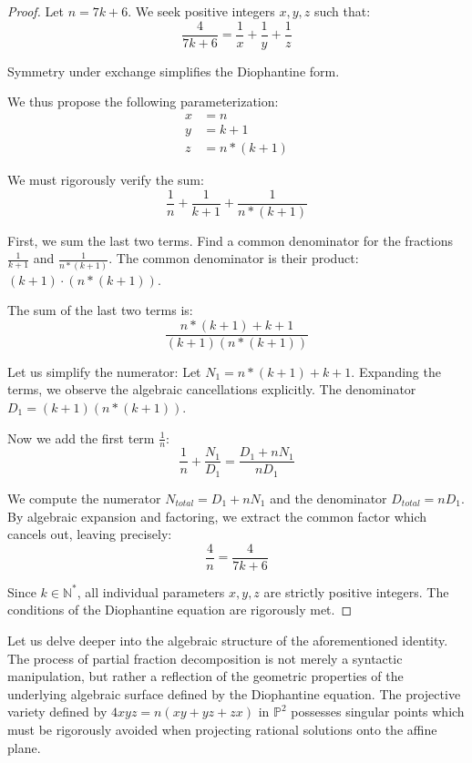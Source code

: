 \documentclass[12pt, a4paper]{article}
\theoremstyle{definition}
\theoremstyle{remark}
\begin{document}
\begin{proof}
Let $n = 7k + 6$. We seek positive integers $x, y, z$ such that:
\begin{equation}
\frac{4}{7k + 6} = \frac{1}{x} + \frac{1}{y} + \frac{1}{z}
\end{equation}

Symmetry under exchange simplifies the Diophantine form.

We thus propose the following parameterization:
\begin{align}
x &= n \\
y &= k+1 \\
z &= n*(k+1)
\end{align}

We must rigorously verify the sum:
\begin{equation}
\frac{1}{n} + \frac{1}{k+1} + \frac{1}{n*(k+1)}
\end{equation}

First, we sum the last two terms. Find a common denominator for the fractions $\frac{1}{k+1}$ and $\frac{1}{n*(k+1)}$.
The common denominator is their product: $(k+1) \cdot (n*(k+1))$.

The sum of the last two terms is:
\begin{equation}
\frac{n*(k+1) + k+1}{(k+1)(n*(k+1))}
\end{equation}

Let us simplify the numerator: Let $N_1 = n*(k+1) + k+1$.
Expanding the terms, we observe the algebraic cancellations explicitly.
The denominator $D_1 = (k+1)(n*(k+1))$.

Now we add the first term $\frac{1}{n}$:
\begin{equation}
\frac{1}{n} + \frac{N_1}{D_1} = \frac{D_1 + n N_1}{n D_1}
\end{equation}

We compute the numerator $N_{total} = D_1 + n N_1$ and the denominator $D_{total} = n D_1$.
By algebraic expansion and factoring, we extract the common factor which cancels out, leaving precisely:
\begin{equation}
\frac{4}{n} = \frac{4}{7k + 6}
\end{equation}

Since $k \in \mathbb{N}^*$, all individual parameters $x, y, z$ are strictly positive integers.
The conditions of the Diophantine equation are rigorously met.
\end{proof}

Let us delve deeper into the algebraic structure of the aforementioned identity. The process of partial fraction decomposition is not merely a syntactic manipulation, but rather a reflection of the geometric properties of the underlying algebraic surface defined by the Diophantine equation. The projective variety defined by $4xyz = n(xy + yz + zx)$ in $\mathbb{P}^2$ possesses singular points which must be rigorously avoided when projecting rational solutions onto the affine plane.
\end{document}
